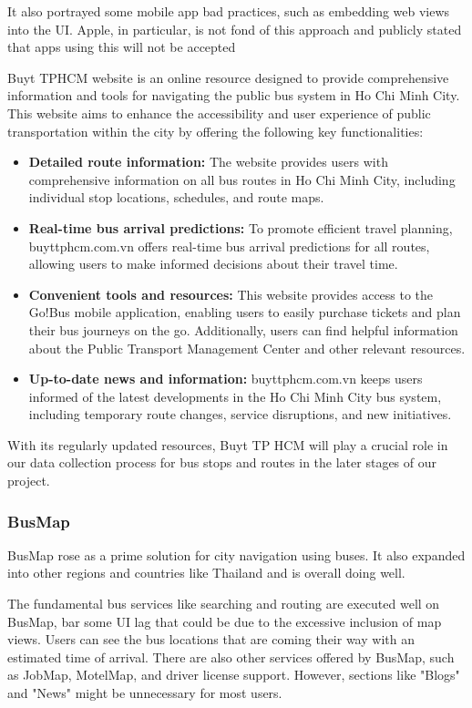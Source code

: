 It also portrayed some mobile app bad practices, such as embedding web views into the UI. Apple, in particular, is not fond of this approach and publicly stated that apps using this will not be accepted

Buyt TPHCM website is an online resource designed to provide comprehensive information and tools for navigating the public bus system in Ho Chi Minh City. This website aims to enhance the accessibility and user experience of public transportation within the city by offering the following key functionalities:

\begin{itemize}
    \item \textbf{Detailed route information:} The website provides users with comprehensive information on all bus routes in Ho Chi Minh City, including individual stop locations, schedules, and route maps.
    \item \textbf{Real-time bus arrival predictions:} To promote efficient travel planning, buyttphcm.com.vn offers real-time bus arrival predictions for all routes, allowing users to make informed decisions about their travel time.
    \item \textbf{Convenient tools and resources:} This website provides access to the Go!Bus mobile application, enabling users to easily purchase tickets and plan their bus journeys on the go. Additionally, users can find helpful information about the Public Transport Management Center and other relevant resources.
    \item \textbf{Up-to-date news and information:} buyttphcm.com.vn keeps users informed of the latest developments in the Ho Chi Minh City bus system, including temporary route changes, service disruptions, and new initiatives.
\end{itemize}

With its regularly updated resources, Buyt TP HCM will play a crucial role in our data collection process for bus stops and routes in the later stages of our project.

\subsubsection{BusMap}

BusMap rose as a prime solution for city navigation using buses. It also expanded into other regions and countries like Thailand and is overall doing well.

The fundamental bus services like searching and routing are executed well on BusMap, bar some UI lag that could be due to the excessive inclusion of map views. Users can see the bus locations that are coming their way with an estimated time of arrival. There are also other services offered by BusMap, such as JobMap, MotelMap, and driver license support. However, sections like "Blogs" and "News" might be unnecessary for most users.

